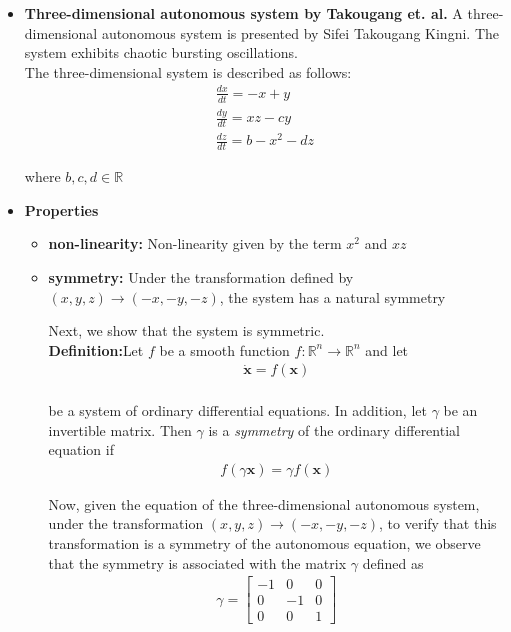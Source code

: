 \begin{itemize}
\item \textbf{Three-dimensional autonomous system by Takougang et. al.}
    A three-dimensional autonomous system is presented by Sifei Takougang Kingni\cite{Takougang13}. The system exhibits chaotic bursting oscillations.\\
    The three-dimensional system is described as follows:\\
    \begin{align}
    \frac{dx}{dt}=-x+y\\
    \frac{dy}{dt}=xz-cy\\
    \frac{dz}{dt}=b-x^2-dz
    \end{align}

    where $b,c,d \in \mathbb{R}$
\item \textbf{Properties}
     \begin{itemize}
     \item \textbf{non-linearity:} Non-linearity given by the term $x^2$ and $xz$
     \item \textbf{symmetry:} Under the transformation defined by $(x,y,z) \rightarrow (-x,-y,-z)$, the system has a natural symmetry

     Next, we show that the system is symmetric.\\
     \textbf{Definition:}Let $f$ be a smooth function $f:\mathbb{R}^n \rightarrow \mathbb{R}^n$ and let\\
 \begin{align*}\mathbf{\dot{x}}=f(\mathbf{x})\end{align*}\\
 be a system of ordinary differential equations. In addition, let $\gamma$ be an invertible matrix. Then $\gamma$ is a \emph{symmetry} of the ordinary differential equation if \\
     \begin{align*}f(\gamma \mathbf{x})=\gamma f(\mathbf{x})\end{align*}

     Now, given the equation of the three-dimensional autonomous system, under the transformation $(x,y,z) \rightarrow (-x,-y,-z)$, to verify that this transformation is a symmetry of the autonomous equation, we observe that the symmetry is associated with the matrix $\gamma$ defined as\\
  \begin{align}
\gamma =
\begin{bmatrix}
-1 & 0 &0 \\
0 & -1 & 0\\
0 & 0 & 1
\end{bmatrix}
\end{align}


\end{itemize}
\end{itemize}
